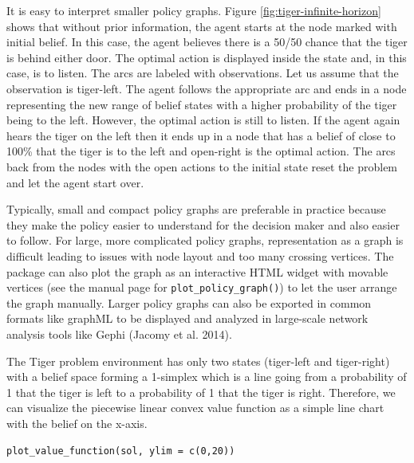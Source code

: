 It is easy to interpret smaller policy graphs. Figure \ref{fig:tiger-infinite-horizon} shows that without prior information,
the agent starts at the node marked with initial belief. In this case,
the agent believes there is a 50/50 chance that the tiger is behind
either door. The optimal action is displayed inside the state and, in this
case, is to listen. The arcs are labeled with observations. Let us
assume that the observation is tiger-left. The agent follows the
appropriate arc and ends in a node representing the new range of belief states with a higher probability of the tiger being to the left.
However, the optimal action is still to listen. If the agent again hears
the tiger on the left then it ends up in a node that has a
belief of close to 100\% that the tiger is to the left and open-right is the optimal
action. The arcs back from the nodes with the open actions to the
initial state reset the problem and let the agent start over.

Typically, small and compact policy graphs are preferable in practice because they make
the policy easier to understand for the decision maker and also easier to follow.
For large, more complicated policy graphs, representation as a graph is difficult
leading to issues with node layout and too many crossing vertices.
The package can also plot the
graph as an interactive HTML widget with movable vertices (see the manual page for \texttt{plot\_policy\_graph()})
to let the user arrange the graph manually.
Larger policy graphs can also be exported in common formats
like graphML to be displayed and analyzed in large-scale network analysis tools like Gephi (Jacomy et al. 2014).

The Tiger problem environment has only two states (tiger-left and tiger-right) with a
belief space forming a 1-simplex which is a line going from a probability of 1 that the tiger is left
to a probability of 1 that the tiger is right. Therefore, we can visualize the piecewise linear
convex value function as a simple line chart with the belief on the x-axis.

\begin{verbatim}
plot_value_function(sol, ylim = c(0,20))
\end{verbatim}


